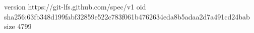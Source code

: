 version https://git-lfs.github.com/spec/v1
oid sha256:63fb348d199fabf32859e522c783f061b4762634eda8b5adaa2d7a491cd24bab
size 4799
